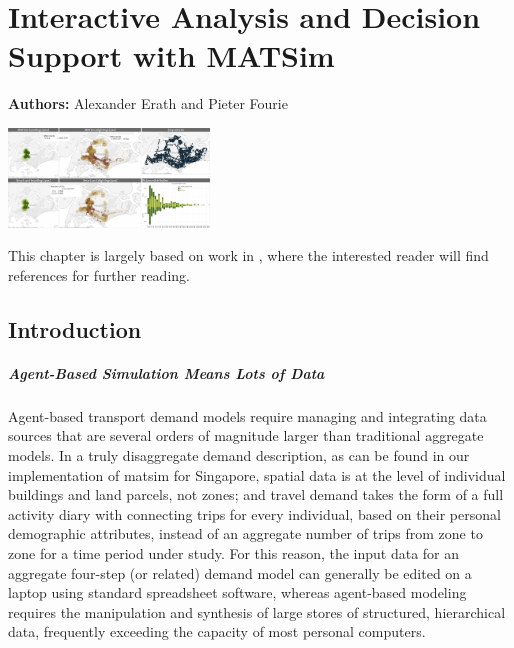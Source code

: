 \chapter{Interactive Analysis and Decision Support with MATSim}
\label{ch:businessanalytics}

\hfill \textbf{Authors:} Alexander Erath and Pieter Fourie

\begin{center} \includegraphics[width=0.4\textwidth, angle=0]{extending/figures/businessanalytics/tableau.png} \end{center}


This chapter is largely based on work in \citet[][]{ErathEtAl_EASTS_2013}, where the interested reader will find references for further reading.
\section{Introduction}
\label{sec:analyticsIntro}
\paragraph{Agent-Based Simulation Means Lots of Data}
Agent-based transport demand models require managing and integrating data sources that are several orders of magnitude larger than traditional aggregate models. In a truly disaggregate demand description, as can be found in our implementation of \gls{matsim} for Singapore, spatial data is at the level of individual buildings and land parcels, not zones; and travel demand takes the form of a full activity diary with connecting trips for every individual, based on their personal demographic attributes, instead of an aggregate number of trips from zone to zone for a time period under study. For this reason, the input data for an aggregate four-step (or related) demand model can generally be edited on a laptop using standard spreadsheet software, whereas agent-based modeling requires the manipulation and synthesis of large stores of structured, hierarchical data, frequently exceeding the capacity of most personal computers. %

